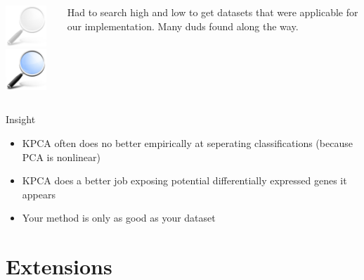 \documentclass[serif]{beamer}
\begin{document}
\begin{frame}[t]
{\begin{itemize}
{\begin{columns}
\begin{column}{3.5in}
							\begin{block}{\vspace{-0.5in}}
							\begin{columns}
								\begin{column}{1.0in}
									\begin{center}
										{
											\includegraphics[width=0.60in]{images/search_dimmed}	
										}
										\only<8>
										{
											\includegraphics[width=0.60in]{images/search}
										}
									\end{center}
								\end{column}
								\begin{column}{2.5in}
									\color<6-7>{blockgray}
									{
										\footnotesize
										Had to search high and low to get datasets that were applicable for our implementation. Many duds found along the way.
									}
								\end{column}	
							\end{columns}
							\end{block}
						\end{column}
					\end{columns}
				}
			\end{itemize}
		}
		{
			{\huge \sc Insight}
		
			\begin{itemize}
				\item  KPCA often does no better empirically at seperating classifications
				(because PCA is nonlinear)
				\item  KPCA does a better job exposing potential differentially
				expressed genes it appears
				\item  Your method is only as good as your dataset
			\end{itemize}		
		}
	\end{frame}
	
	\section{Extensions}
	
\end{document}

